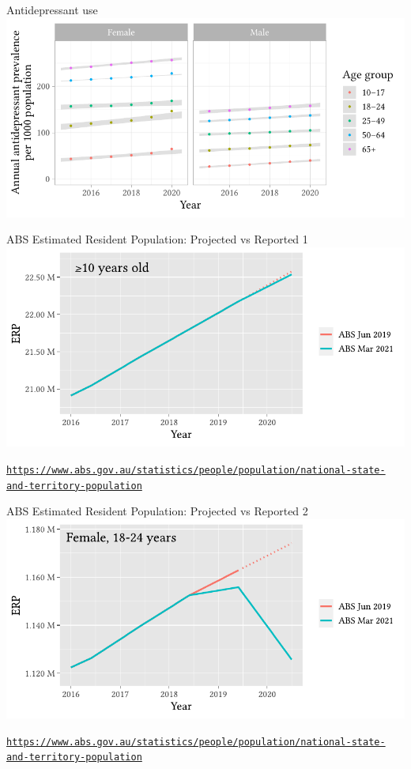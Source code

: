 \documentclass[aspectratio=169,12pt]{beamer} %
\begin{document}
\begin{frame}{Antidepressant use}
\centering
\includegraphics[height=0.8\textheight]
        {ref/covid19mh-prev-age.pdf}
	\nocite{costa_2023}
\end{frame}

\begin{frame}{ABS Estimated Resident Population: Projected vs Reported 1}
	\center\includegraphics[height=0.75\textheight]{ref/pops-overall.pdf}
	\begin{flushright}\tiny\texttt{\url{https://www.abs.gov.au/statistics/people/population/national-state-and-territory-population}}\end{flushright}
\end{frame}

\begin{frame}{ABS Estimated Resident Population: Projected vs Reported 2}
	\center\includegraphics[height=0.75\textheight]{ref/pops-f18-24.pdf}
	\begin{flushright}\tiny\texttt{\url{https://www.abs.gov.au/statistics/people/population/national-state-and-territory-population}}\end{flushright}
\end{frame}
\end{document}
